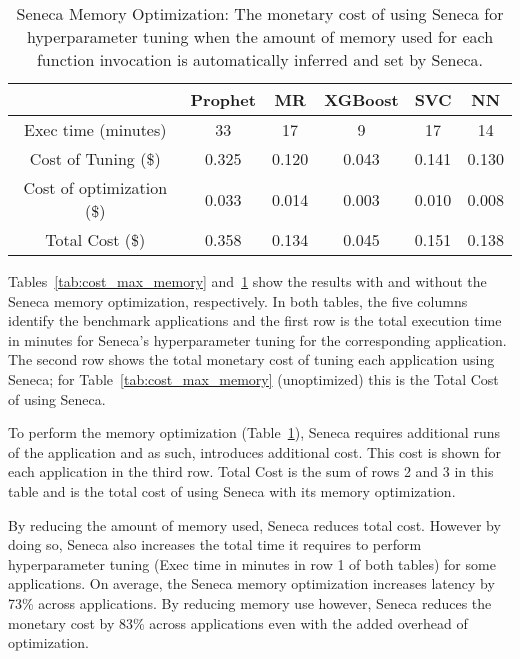 \begin{table}
\centering
\begin{tabular}{|c|c|c|c|c|c|}
\hline
& Prophet & MR & XGBoost & SVC & NN\\
\hline
\hline
Exec time (minutes)& 33 & 17 & 9 & 17 & 14 \\
\hline
Cost of Tuning (\$) &0.325 & 0.120 & 0.043 & 0.141 & 0.130 \\
\hline
Cost of optimization (\$) &0.033 & 0.014 & 0.003 & 0.010 & 0.008 \\
\hline
Total Cost (\$) &0.358 & 0.134 & 0.045 & 0.151 & 0.138 \\
\hline
\end{tabular}
\caption{Seneca  Memory  Optimization:  The  monetary  cost  of 
using Seneca for hyperparameter tuning when the amount of memory  
used  for  each  function  invocation  is  automatically
inferred and set by Seneca.
\label{tab:cost_optimized}}
\vspace{-0.2in}
\end{table}

Tables~\ref{tab:cost_max_memory} and~\ref{tab:cost_optimized} show the results with and without 
the Seneca memory optimization, respectively. In both tables, the five columns identify the 
benchmark applications and the first row is the total execution time in minutes for 
Seneca's hyperparameter tuning for the corresponding application.  
The second row shows the total monetary cost of tuning each application using Seneca;
for Table~\ref{tab:cost_max_memory} (unoptimized) this is the Total Cost of using Seneca.

To perform the memory optimization (Table~\ref{tab:cost_optimized}), 
Seneca requires additional runs of the application
and as such, introduces additional cost.  This cost is shown for each application in 
the third row.  Total Cost is the sum of rows 2 and 3 in this table and is the 
total cost of using Seneca with its memory optimization.

By reducing the amount of memory used, Seneca reduces total cost.  
However by doing so, Seneca also 
increases the total time it requires to perform hyperparameter tuning (Exec time in minutes 
in row 1 of both tables) for some applications.  
On average, the Seneca memory optimization increases latency by 73\% across applications.
By reducing memory use however, Seneca reduces the monetary cost by 83\% across applications 
even with the added overhead of optimization.




